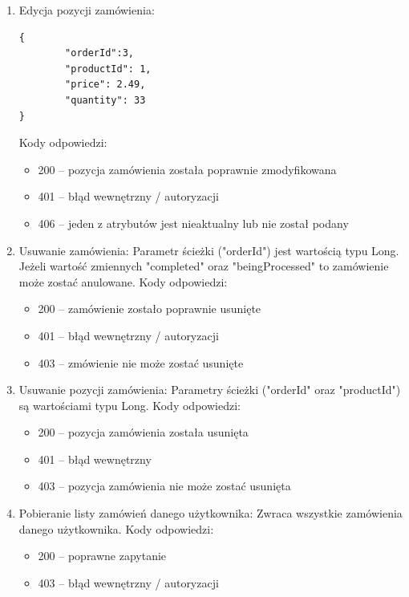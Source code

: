 \documentclass[11pt,a4paper,twoside]{article}
\begin{document}
\begin{enumerate}
\item Edycja pozycji zamówienia:
\begin{lstlisting}
{
        "orderId":3,
        "productId": 1,
        "price": 2.49,
        "quantity": 33
}
\end{lstlisting}
\vspace{-20pt}
Kody odpowiedzi:
\begin{itemize}
\item 200 -- pozycja zamówienia została poprawnie zmodyfikowana
\item 401 -- błąd wewnętrzny / autoryzacji
\item 406 -- jeden z atrybutów jest nieaktualny lub nie został podany
\end{itemize}
\item Usuwanie zamówienia:
Parametr ścieżki ("orderId") jest wartością typu Long. Jeżeli wartość zmiennych "completed" oraz "beingProcessed"  to zamówienie może zostać anulowane.
Kody odpowiedzi:
\begin{itemize}
\item 200 -- zamówienie zostało poprawnie usunięte
\item 401 -- błąd wewnętrzny / autoryzacji
\item 403 -- zmówienie nie może zostać usunięte
\end{itemize}
\item Usuwanie pozycji zamówienia:
Parametry ścieżki ("orderId" oraz "productId") są wartościami typu Long.
Kody odpowiedzi:
\begin{itemize}
\item 200 -- pozycja zamówienia została usunięta
\item 401 -- błąd wewnętrzny
\item 403 -- pozycja zamówienia nie może zostać usunięta
\end{itemize}
\item Pobieranie listy zamówień danego użytkownika:
Zwraca wszystkie zamówienia danego użytkownika.
Kody odpowiedzi:
\begin{itemize}
\item 200 -- poprawne zapytanie
\item 403 -- błąd wewnętrzny / autoryzacji
\end{itemize}
\end{enumerate}


\newpage
\end{document}
